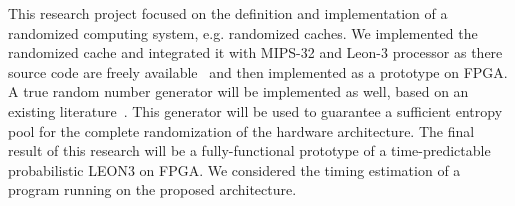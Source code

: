 %
This research project  focused on the definition and implementation of a randomized computing system, e.g. randomized caches. We implemented the randomized cache and integrated it with MIPS-32 and Leon-3 processor as there  source code are freely available~\cite{leon3, ION} and then implemented as a prototype on FPGA. A true random
number generator will be implemented as well, based on an existing literature~\cite{OpenCores}. This generator will be
used to guarantee a sufficient entropy pool for the complete randomization of the hardware architecture. The final result of this research will be a fully-functional prototype of a time-predictable probabilistic LEON3 on FPGA. We  considered the timing estimation of a program running on the proposed architecture. 
%

